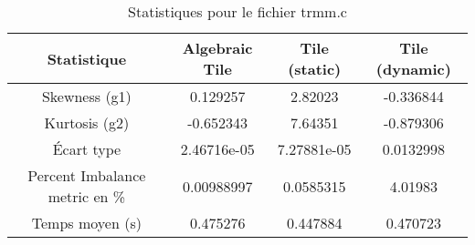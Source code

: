 \documentclass{article}
\begin{document}
\begin{table}[htbp]
  \centering
  \caption{Statistiques pour le fichier trmm.c}
  \begin{tabular}{|c|c|c|c|}
    \hline
    Statistique & Algebraic Tile & Tile (static) & Tile (dynamic) \\ 
    \hline
    Skewness (g1) & 0.129257 & 2.82023 & -0.336844 \\ 
    Kurtosis (g2) & -0.652343 & 7.64351 & -0.879306 \\ 
    Écart type & 2.46716e-05 & 7.27881e-05 & 0.0132998\\ 
    Percent Imbalance metric en \% & 0.00988997 & 0.0585315 & 4.01983\\ 
    Temps moyen (s) & 0.475276 & 0.447884 & 0.470723 \\ 
    \hline
  \end{tabular}
\end{table}
\newpage
\end{document}
